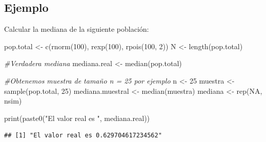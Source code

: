 \documentclass[
]{book}
\newenvironment{Shaded}{\begin{snugshade}}{\end{snugshade}}
\newcommand{\CommentTok}[1]{\textcolor[rgb]{0.56,0.35,0.01}{\textit{#1}}}
\newcommand{\ConstantTok}[1]{\textcolor[rgb]{0.00,0.00,0.00}{#1}}
\newcommand{\DecValTok}[1]{\textcolor[rgb]{0.00,0.00,0.81}{#1}}
\newcommand{\FunctionTok}[1]{\textcolor[rgb]{0.00,0.00,0.00}{#1}}
\newcommand{\NormalTok}[1]{#1}
\newcommand{\OtherTok}[1]{\textcolor[rgb]{0.56,0.35,0.01}{#1}}
\newcommand{\StringTok}[1]{\textcolor[rgb]{0.31,0.60,0.02}{#1}}
\begin{document}
\hypertarget{ejemplo-4}{%
\subsection{Ejemplo}\label{ejemplo-4}}

Calcular la mediana de la siguiente población:

\begin{Shaded}
\begin{Highlighting}[]
\NormalTok{pop.total }\OtherTok{\textless{}{-}} \FunctionTok{c}\NormalTok{(}\FunctionTok{rnorm}\NormalTok{(}\DecValTok{100}\NormalTok{), }\FunctionTok{rexp}\NormalTok{(}\DecValTok{100}\NormalTok{), }\FunctionTok{rpois}\NormalTok{(}\DecValTok{100}\NormalTok{, }\DecValTok{2}\NormalTok{))}
\NormalTok{N }\OtherTok{\textless{}{-}} \FunctionTok{length}\NormalTok{(pop.total)}

\CommentTok{\#Verdadera mediana}
\NormalTok{mediana.real }\OtherTok{\textless{}{-}} \FunctionTok{median}\NormalTok{(pop.total)}

\CommentTok{\#Obtenemos muestra de tamaño n = 25 por ejemplo}
\NormalTok{n }\OtherTok{\textless{}{-}} \DecValTok{25}
\NormalTok{muestra          }\OtherTok{\textless{}{-}} \FunctionTok{sample}\NormalTok{(pop.total, }\DecValTok{25}\NormalTok{)}
\NormalTok{mediana.muestral }\OtherTok{\textless{}{-}} \FunctionTok{median}\NormalTok{(muestra)}
\NormalTok{mediana          }\OtherTok{\textless{}{-}} \FunctionTok{rep}\NormalTok{(}\ConstantTok{NA}\NormalTok{, nsim)}

\FunctionTok{print}\NormalTok{(}\FunctionTok{paste0}\NormalTok{(}\StringTok{"El valor real es "}\NormalTok{, mediana.real))}
\end{Highlighting}
\end{Shaded}

\begin{verbatim}
## [1] "El valor real es 0.629704617234562"
\end{verbatim}
\end{document}
